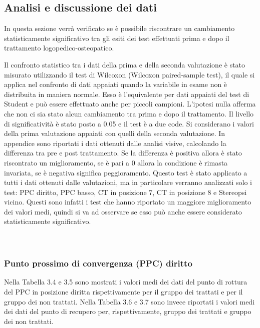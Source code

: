  
 
\subsection{Analisi e discussione dei dati}
 
In questa sezione verrà verificato se è possibile riscontrare un cambiamento statisticamente significativo tra gli esiti dei test effettuati prima e dopo il trattamento logopedico-osteopatico.
 
Il confronto statistico tra i dati della prima e della seconda valutazione è stato misurato utilizzando il test di Wilcoxon (Wilcoxon paired-sample test), il quale si applica nel confronto di dati appaiati quando la variabile in esame non è distribuita in maniera normale. Esso è l’equivalente per dati appaiati del test di Student e può essere effettuato anche per piccoli campioni. L’ipotesi nulla afferma che non ci sia stato alcun cambiamento tra prima e dopo il trattamento. Il livello di significatività è stato posto a 0.05 e il test è a due code. Si considerano i valori della prima valutazione appaiati con quelli della seconda valutazione. In appendice sono riportati i dati ottenuti dalle analisi visive, calcolando la differenza tra pre e post trattamento. Se la differenza è positiva allora è stato riscontrato un miglioramento, se è pari a 0 allora la condizione è rimasta invariata, se è negativa significa peggioramento. Questo test è stato applicato a tutti i dati ottenuti dalle valutazioni, ma in particolare verranno analizzati solo i test: PPC diritto, PPC basso, CT in posizione 7, CT in posizione 8 e Stereopsi vicino. Questi sono infatti i test che hanno riportato un maggiore miglioramento dei valori medi, quindi si va ad osservare se esso può anche essere considerato statisticamente significativo. 
\\\ \\\
\subsubsection{Punto prossimo di convergenza (PPC) diritto}

Nella Tabella 3.4 e 3.5 sono mostrati i valori medi dei dati del punto di rottura del PPC in posizione diritta rispettivamente per il gruppo dei trattati e per il gruppo dei non trattati. Nella Tabella 3.6 e 3.7 sono invece riportati i valori medi dei dati del punto di recupero per, rispettivamente, gruppo dei trattati e gruppo dei non trattati.

